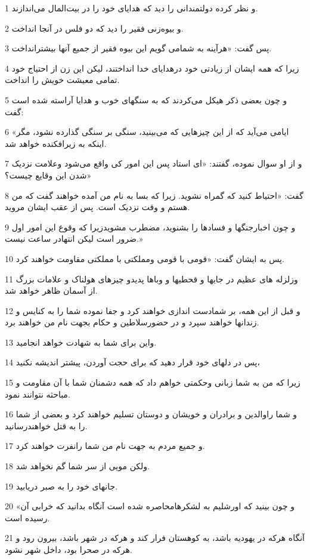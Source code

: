 \par 1 و نظر کرده دولتمندانی را دید که هدایای خود را در بیت‌المال می‌اندازند.
\par 2 و بیوه‌زنی فقیر را دید که دو فلس در آنجا انداخت.
\par 3 پس گفت: «هرآینه به شمامی گویم این بیوه فقیر از جمیع آنها بیشترانداخت.
\par 4 زیرا که همه ایشان از زیادتی خود درهدایای خدا انداختند، لیکن این زن از احتیاج خود تمامی معیشت خویش را انداخت.
\par 5 و چون بعضی ذکر هیکل می‌کردند که به سنگهای خوب و هدایا آراسته شده است گفت:
\par 6 «ایامی می‌آید که از این چیزهایی که می‌بینید، سنگی بر سنگی گذارده نشود، مگر اینکه به زیرافکنده خواهد شد.
\par 7 و از او سوال نموده، گفتند: «ای استاد پس این امور کی واقع می‌شود وعلامت نزدیک شدن این وقایع چیست؟»
\par 8 گفت: «احتیاط کنید که گمراه نشوید. زیرا که بسا به نام من آمده خواهند گفت که من هستم و وقت نزدیک است. پس از عقب ایشان مروید.
\par 9 و چون اخبارجنگها و فسادها را بشنوید، مضطرب مشویدزیرا که وقوع این امور اول ضرور است لیکن انتهادر ساعت نیست.»
\par 10 پس به ایشان گفت: «قومی با قومی ومملکتی با مملکتی مقاومت خواهند کرد.
\par 11 وزلزله های عظیم در جایها و قحطیها و وباها پدیدو چیزهای هولناک و علامات بزرگ از آسمان ظاهر خواهد شد.
\par 12 و قبل از این همه، بر شمادست اندازی خواهند کرد و جفا نموده شما را به کنایس و زندانها خواهند سپرد و در حضورسلاطین و حکام بجهت نام من خواهند برد.
\par 13 واین برای شما به شهادت خواهد انجامید.
\par 14 پس در دلهای خود قرار دهید که برای حجت آوردن، پیشتر اندیشه نکنید،
\par 15 زیرا که من به شما زبانی وحکمتی خواهم داد که همه دشمنان شما با آن مقاومت و مباحثه نتوانند نمود.
\par 16 و شما راوالدین و برادران و خویشان و دوستان تسلیم خواهند کرد و بعضی از شما را به قتل خواهندرسانید.
\par 17 و جمیع مردم به جهت نام من شما رانفرت خواهند کرد.
\par 18 ولکن مویی از سر شما گم نخواهد شد.
\par 19 جانهای خود را به صبر دریابید.
\par 20 «و چون بینید که اورشلیم به لشکرهامحاصره شده است آنگاه بدانید که خرابی آن رسیده است.
\par 21 آنگاه هر‌که در یهودیه باشد، به کوهستان فرار کند و هر‌که در شهر باشد، بیرون رود و هر‌که در صحرا بود، داخل شهر نشود.
